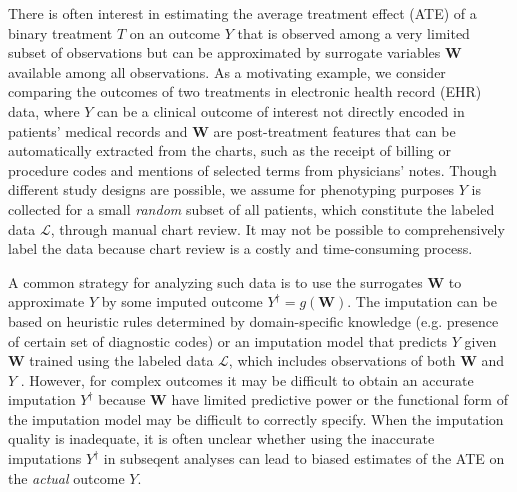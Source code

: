 \documentclass[useAMS,referee,usenatbib]{biom}
\def\bW{\mathbf{W}}
\def\Ydag{Y^{\dagger}}
\def\Lscr{\mathscr{L}}
\begin{document}
There is often interest in estimating the average treatment effect (ATE) of a binary treatment $T$ on 
an outcome $Y$ that is observed among a very limited subset of observations but can be approximated by surrogate variables $\bW$ 
available among all observations.
As a motivating example, we consider comparing the outcomes of two treatments in electronic health record (EHR) data,
where $Y$ can be a clinical outcome of interest not directly encoded in patients' medical records and $\bW$ are post-treatment 
features that can be automatically extracted from the charts, such as the receipt of billing or procedure codes and mentions
of selected terms from physicians' notes.  Though different study designs are possible, we assume for phenotyping purposes $Y$ is collected for a small \emph{random} subset of all patients, which constitute the labeled data $\Lscr$,
through manual chart review. It may not be possible to comprehensively label the data because chart review is a costly and
time-consuming process.

A common strategy for analyzing such data is to use the surrogates $\bW$ to approximate $Y$ by some imputed outcome 
$\Ydag = g(\bW)$.  The imputation can be based on heuristic rules determined by domain-specific knowledge 
(e.g. presence of certain set of diagnostic codes) or an imputation model that predicts $Y$ given $\bW$ trained using the labeled data $\Lscr$, which includes observations of both $\bW$ and $Y$ \citep{ananthakrishnan2016comparative}.  
However, for complex outcomes it may be difficult to obtain an accurate imputation $\Ydag$ because $\bW$ have limited 
predictive power or the functional form of the imputation model may be difficult to correctly specify.  
When the imputation quality is inadequate, it is often unclear whether using the inaccurate imputations $\Ydag$ in subseqent analyses can lead to biased 
estimates of the ATE on the \emph{actual} outcome $Y$.
\end{document}

